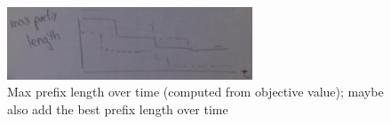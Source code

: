 \begin{figure}[t!]
\begin{center}
\includegraphics[width=0.65\textwidth]{figs/sketch-max-length.png}
\end{center}
\caption{Max prefix length over time (computed from objective value);
maybe also add the best prefix length over time}
\label{fig:max-length}
\end{figure}
